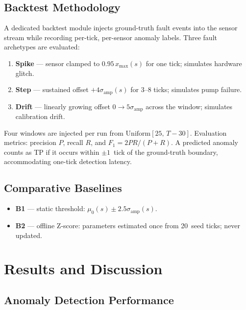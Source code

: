 \documentclass[journal,10pt,twocolumn]{IEEEtran}
\begin{document}
\subsection{Backtest Methodology}

A dedicated backtest module injects ground-truth fault events into the
sensor stream while recording per-tick, per-sensor anomaly labels.
Three fault archetypes are evaluated:
\begin{enumerate}
  \item \textbf{Spike} — sensor clamped to $0.95\,x_{\max}(s)$ for one
        tick; simulates hardware glitch.
  \item \textbf{Step} — sustained offset $+4\sigma_{\mathrm{amp}}(s)$
        for 3--8 ticks; simulates pump failure.
  \item \textbf{Drift} — linearly growing offset 0$\to$$5\sigma_{\mathrm{amp}}$
        across the window; simulates calibration drift.
\end{enumerate}
Four windows are injected per run from
$\mathrm{Uniform}[25,\,T{-}30]$.
Evaluation metrics: precision $P$, recall $R$, and
$F_1 = 2PR/(P+R)$.
A predicted anomaly counts as TP if it occurs within $\pm1$~tick of
the ground-truth boundary, accommodating one-tick detection latency.

\subsection{Comparative Baselines}

\begin{itemize}
  \item \textbf{B1} — static threshold: $\mu_0(s)\pm2.5\sigma_{\mathrm{amp}}(s)$.
  \item \textbf{B2} — offline Z-score: parameters estimated once
        from 20~seed ticks; never updated.
\end{itemize}

\section{Results and Discussion}
\label{sec:results}

\subsection{Anomaly Detection Performance}
\end{document}
